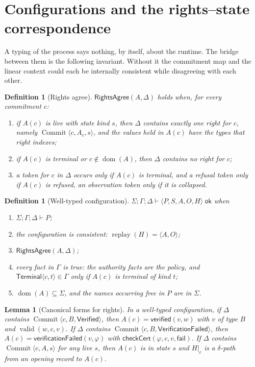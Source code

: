 \documentclass[11pt,openany]{book}
\newtheorem{lemma}[theorem]{Lemma}
\newtheorem{definition}[theorem]{Definition}
\theoremstyle{remark}
\newcommand{\Commit}{\operatorname{Commit}}
\newcommand{\dom}{\operatorname{dom}}
\newcommand{\replay}{\operatorname{replay}}
\newcommand{\valid}{\operatorname{valid}}
\begin{document}
\section{Configurations and the rights--state correspondence}

A typing of the process says nothing, by itself, about the runtime. The
bridge between them is the following invariant. Without it the
commitment map and the linear context could each be internally consistent
while disagreeing with each other.

\begin{definition}[Rights agree]\label{def:rights}
$\mathsf{RightsAgree}(A,\Delta)$ holds when, for every commitment $c$:
\begin{enumerate}[label=(\roman*)]
\item if $A(c)$ is live with state kind $s$, then $\Delta$ contains exactly
one right for $c$, namely $\Commit\langle c,A_c,s\rangle$, and the values
held in $A(c)$ have the types that right indexes;
\item if $A(c)$ is terminal or $c\notin\dom(A)$, then $\Delta$ contains no
right for $c$;
\item a token for $c$ in $\Delta$ occurs only if $A(c)$ is terminal, and a
refusal token only if $A(c)$ is refused, an observation token only if it
is collapsed.
\end{enumerate}
\end{definition}

\begin{definition}[Well-typed configuration]\label{def:wtconf}
$\Sigma;\Gamma;\Delta\vdash\langle P,S,A,O,H\rangle\;\mathsf{ok}$ when
\begin{enumerate}[label=(C\arabic*)]
\item $\Sigma;\Gamma;\Delta\vdash P$;
\item the configuration is consistent: $\replay(H)=\langle A,O\rangle$;
\item $\mathsf{RightsAgree}(A,\Delta)$;
\item every fact in $\Gamma$ is true: the authority facts are the policy,
and $\mathsf{Terminal}\langle c,t\rangle\in\Gamma$ only if $A(c)$ is
terminal of kind $t$;
\item $\dom(A)\subseteq\Sigma$, and the names occurring free in $P$ are
in $\Sigma$.
\end{enumerate}
\end{definition}

\begin{lemma}[Canonical forms for rights]\label{lem:canon}
In a well-typed configuration, if $\Delta$ contains
$\Commit\langle c,B,\mathsf{Verified}\rangle$, then
$A(c)=\mathsf{verified}(v,w)$ with $v$ of type $B$ and $\valid(w,c,v)$. If
$\Delta$ contains $\Commit\langle c,B,\mathsf{VerificationFailed}\rangle$,
then $A(c)=\mathsf{verificationFailed}(v,\varphi)$ with
$\mathsf{checkCert}(\varphi,c,v,\mathsf{fail})$. If $\Delta$ contains
$\Commit\langle c,A,s\rangle$ for any live $s$, then $A(c)$ is in state
$s$ and $H|_c$ is a $\delta$-path from an opening record to $A(c)$.
\end{lemma}
\end{document}
